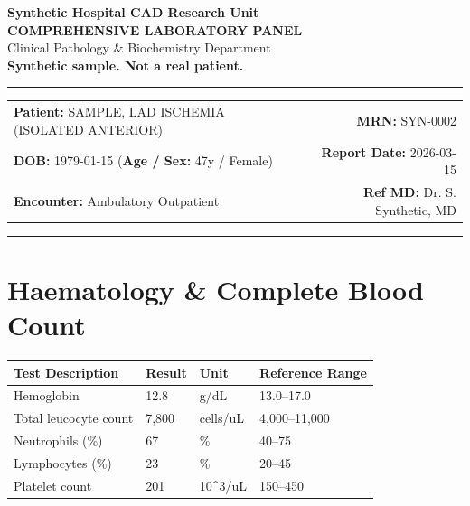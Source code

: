 \documentclass[10pt,a4paper]{article}
\begin{document}
\begin{center}
  {\Large \textbf{Synthetic Hospital CAD Research Unit}}\\
  \vspace{2pt}
  {\normalsize \textbf{COMPREHENSIVE LABORATORY PANEL}}\\
  \vspace{1pt}
  {\footnotesize \textcolor{subtext}{Clinical Pathology \& Biochemistry Department}}\\
  \vspace{4pt}
  {\small \textbf{\textcolor{red!75!black}{Synthetic sample. Not a real patient.}}}\\
  \vspace{3pt}
  \textcolor{linecolor}{\rule{\textwidth}{0.8pt}}
\end{center}

\vspace{2pt}

\noindent
\begin{tabular*}{\textwidth}{@{} l @{\extracolsep{\fill}} r @{}}
  \textbf{Patient:} SAMPLE, LAD ISCHEMIA (ISOLATED ANTERIOR) & \textbf{MRN:} SYN-0002 \\
  \textbf{DOB:} 1979-01-15 \quad (\textbf{Age / Sex:} 47y / Female) & \textbf{Report Date:} 2026-03-15 \\
  \textbf{Encounter:} Ambulatory Outpatient & \textbf{Ref MD:} Dr. S. Synthetic, MD \\
\end{tabular*}

\vspace{2pt}
\noindent\textcolor{linecolor}{\rule{\textwidth}{0.4pt}}
\vspace{6pt}


\section*{Haematology \& Complete Blood Count}

\begin{tabular}{@{} p{6.4cm} p{2.5cm} p{2.5cm} p{3.1cm} @{}}
  \toprule
  \textbf{Test Description} & \textbf{Result} & \textbf{Unit} & \textbf{Reference Range} \\
  \midrule
  Hemoglobin & 12.8 & g/dL & 13.0--17.0 \\
  Total leucocyte count & 7,800 & cells/uL & 4,000--11,000 \\
  Neutrophils (\%) & 67 & \% & 40--75 \\
  Lymphocytes (\%) & 23 & \% & 20--45 \\
  Platelet count & 201 & 10\textasciicircum 3/uL & 150--450 \\
  \bottomrule
\end{tabular}
\end{document}
